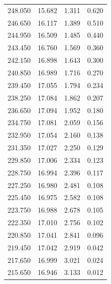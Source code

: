\begin{table}[H]
\begin{tabular}{S S S S}
    248.050 & 15.682 & 1.311 & 0.620 \\
    246.650 & 16.117 & 1.389 & 0.510 \\
    244.950 & 16.509 & 1.485 & 0.440 \\
    243.450 & 16.760 & 1.569 & 0.360 \\
    242.150 & 16.898 & 1.643 & 0.300 \\
    240.850 & 16.989 & 1.716 & 0.270 \\
    239.450 & 17.055 & 1.794 & 0.234 \\
    238.250 & 17.084 & 1.862 & 0.207 \\
    236.650 & 17.094 & 1.952 & 0.180 \\
    234.750 & 17.081 & 2.059 & 0.156 \\
    232.950 & 17.054 & 2.160 & 0.138 \\
    231.350 & 17.027 & 2.250 & 0.129 \\
    229.850 & 17.006 & 2.334 & 0.123 \\
    228.750 & 16.994 & 2.396 & 0.117 \\
    227.250 & 16.980 & 2.481 & 0.108 \\
    225.450 & 16.975 & 2.582 & 0.108 \\
    223.750 & 16.988 & 2.678 & 0.105 \\
    222.350 & 17.010 & 2.756 & 0.102 \\
    220.850 & 17.041 & 2.841 & 0.096 \\
    219.450 & 17.042 & 2.919 & 0.042 \\
    217.650 & 16.999 & 3.021 & 0.024 \\
    215.650 & 16.946 & 3.133 & 0.012 \\
    \bottomrule
  \end{tabular}
\end{table}

